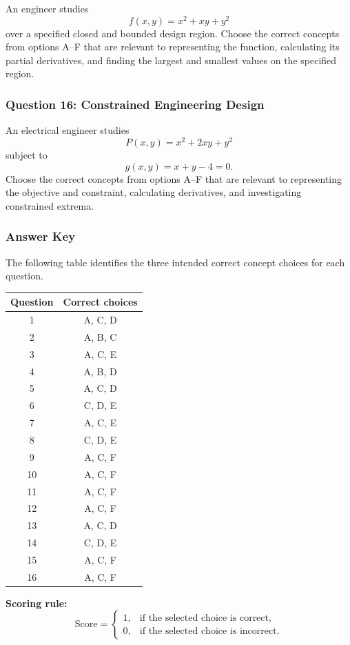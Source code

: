 \documentclass[a4paper,12pt]{article}
\theoremstyle{mystyle}
\numberwithin{equation}{section}
\numberwithin{theorem}{section}
\numberwithin{proposition}{section}
\numberwithin{example}{section}
\numberwithin{remark}{section}
\numberwithin{lemma}{section}
\numberwithin{corollary}{section}
\numberwithin{definition}{section}
\begin{document}
An engineer studies
\[
f(x,y)=x^2+xy+y^2
\]
over a specified closed and bounded design region.
Choose the correct concepts from options A--F that
are relevant to representing the function, calculating
its partial derivatives, and finding the largest and
smallest values on the specified region.

\subsubsection*{Question 16: Constrained Engineering Design}

An electrical engineer studies
\[
P(x,y)=x^2+2xy+y^2
\]
subject to
\[
g(x,y)=x+y-4=0.
\]
Choose the correct concepts from options A--F that
are relevant to representing the objective and
constraint, calculating derivatives, and investigating
constrained extrema.

\subsubsection*{Answer Key}

The following table identifies the three intended
correct concept choices for each question.

\begin{center}
\begin{tabular}{cc}
\toprule
\textbf{Question} & \textbf{Correct choices}\\
\midrule
1  & A, C, D\\
2  & A, B, C\\
3  & A, C, E\\
4  & A, B, D\\
5  & A, C, D\\
6  & C, D, E\\
7  & A, C, E\\
8  & C, D, E\\
9  & A, C, F\\
10 & A, C, F\\
11 & A, C, F\\
12 & A, C, F\\
13 & A, C, D\\
14 & C, D, E\\
15 & A, C, F\\
16 & A, C, F\\
\bottomrule
\end{tabular}
\end{center}

\noindent
\textbf{Scoring rule:}
\[
\text{Score}=
\begin{cases}
1, & \text{if the selected choice is correct},\\
0, & \text{if the selected choice is incorrect}.
\end{cases}
\]

\printbibliography
\end{document}
